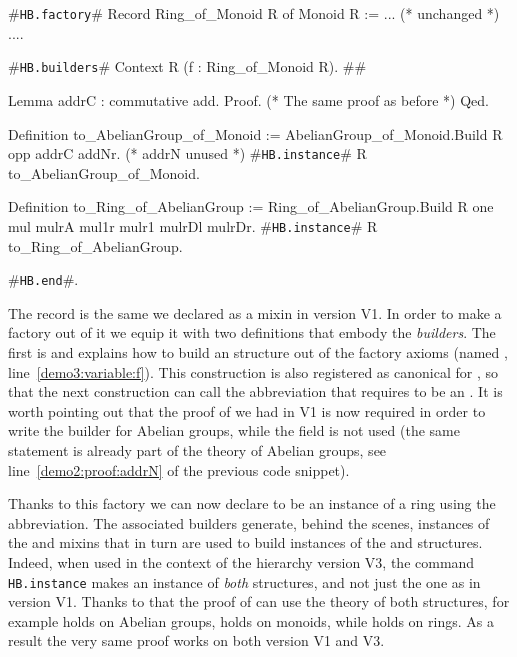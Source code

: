 \documentclass[a4paper,UKenglish,cleveref, autoref]{lipics-v2019}
\newcommand{\mixin}{mixin}
\newcommand{\mixins}{mixins}
\newcommand{\factory}{factory}
\newcommand{\phantterm}{abbreviation}
\newcommand{\builder}{builder}
\newcommand{\hbfactory}{{\tt\color{dkgreen}HB.factory}}
\newcommand{\hbinstance}{{\tt\color{dkgreen}HB.instance}}
\newcommand{\hbbuilders}{{\tt\color{dkgreen}HB.builders}}
\newcommand{\hbend}{{\tt\color{dkgreen}HB.end}}
\theoremstyle{implem}
\theoremstyle{implem}
\theoremstyle{command}
\theoremstyle{commands}
\begin{document}
\begin{coqcode}
#\hbfactory{}# Record Ring_of_Monoid R of Monoid R := { ... (* unchanged *) ...}.

#\hbbuilders{}# Context R (f : Ring_of_Monoid R).                          #\label{demo3:variable:f}#

  Lemma addrC : commutative add. Proof. (* The same proof as before *) Qed.

  Definition to_AbelianGroup_of_Monoid :=
    AbelianGroup_of_Monoid.Build R opp addrC addNr. (* addrN unused *)
  #\hbinstance{}# R to_AbelianGroup_of_Monoid.

  Definition to_Ring_of_AbelianGroup := Ring_of_AbelianGroup.Build R one mul
    mulrA mul1r mulr1 mulrDl mulrDr.
  #\hbinstance{}# R to_Ring_of_AbelianGroup.

#\hbend{}#.
\end{coqcode}

The record  is the same we declared as a \mixin{}
in version V1. In order to make a \factory{} out of it we equip it with
two definitions that embody the \emph{\builder{}s}.
The first is  and
explains how to build an  structure out of the \factory{}
axioms (named , line~\ref{demo3:variable:f}).
This construction is also registered as canonical for ,
so that the next construction  can call
the  \phantterm{} that requires  to be
an .
It is worth pointing out that the proof of  we had in V1 is now
required in order to write the \builder{} for Abelian groups, while
the  field is not used (the same statement is already part of
the theory of Abelian groups, see line~\ref{demo2:proof:addrN} of the previous
code snippet).

Thanks to this \factory{} we can now declare  to be an instance
of a ring using the  \phantterm{}.
The associated \builder{}s generate, behind the scenes, instances of the
 and  \mixins{}
that in turn are used to build instances of the  and 
structures. Indeed, when used in the context of the hierarchy version V3,
the command \hbinstance{} 
makes  an instance of \emph{both} structures, and not just the 
one as in version V1.
Thanks to that the proof of  can use the theory of
both structures, for example  holds on Abelian groups,
 holds on monoids, while  holds on rings.
As a result the very same proof works on both
version V1 and V3.
\end{document}
